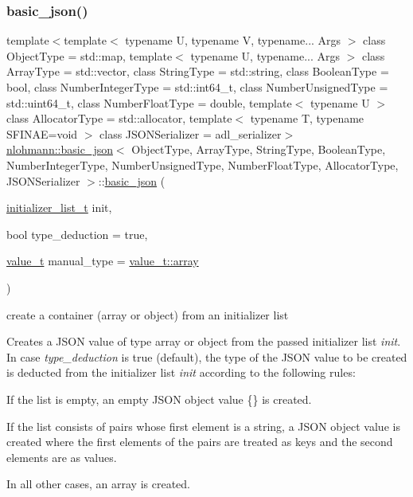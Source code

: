 \subsubsection{\texorpdfstring{basic\+\_\+json()}{basic\_json()}\hspace{0.1cm}{\footnotesize\ttfamily [5/9]}}
{\footnotesize\ttfamily template$<$template$<$ typename U, typename V, typename... Args $>$ class Object\+Type = std\+::map, template$<$ typename U, typename... Args $>$ class Array\+Type = std\+::vector, class String\+Type  = std\+::string, class Boolean\+Type  = bool, class Number\+Integer\+Type  = std\+::int64\+\_\+t, class Number\+Unsigned\+Type  = std\+::uint64\+\_\+t, class Number\+Float\+Type  = double, template$<$ typename U $>$ class Allocator\+Type = std\+::allocator, template$<$ typename T, typename S\+F\+I\+N\+A\+E=void $>$ class J\+S\+O\+N\+Serializer = adl\+\_\+serializer$>$ \\
\mbox{\hyperlink{classnlohmann_1_1basic__json}{nlohmann\+::basic\+\_\+json}}$<$ Object\+Type, Array\+Type, String\+Type, Boolean\+Type, Number\+Integer\+Type, Number\+Unsigned\+Type, Number\+Float\+Type, Allocator\+Type, J\+S\+O\+N\+Serializer $>$\+::\mbox{\hyperlink{classnlohmann_1_1basic__json}{basic\+\_\+json}} (\begin{DoxyParamCaption}\item[{\mbox{\hyperlink{classnlohmann_1_1basic__json_ad70a098fbc01c53497db29d3b5b656a9}{initializer\+\_\+list\+\_\+t}}}]{init,  }\item[{bool}]{type\+\_\+deduction = {\ttfamily true},  }\item[{\mbox{\hyperlink{namespacenlohmann_1_1detail_a1ed8fc6239da25abcaf681d30ace4985}{value\+\_\+t}}}]{manual\+\_\+type = {\ttfamily \mbox{\hyperlink{namespacenlohmann_1_1detail_a1ed8fc6239da25abcaf681d30ace4985af1f713c9e000f5d3f280adbd124df4f5}{value\+\_\+t\+::array}}} }\end{DoxyParamCaption})\hspace{0.3cm}{\ttfamily [inline]}}



create a container (array or object) from an initializer list 

Creates a J\+S\+ON value of type array or object from the passed initializer list {\itshape init}. In case {\itshape type\+\_\+deduction} is {\ttfamily true} (default), the type of the J\+S\+ON value to be created is deducted from the initializer list {\itshape init} according to the following rules\+:


\begin{DoxyEnumerate}
\item If the list is empty, an empty J\+S\+ON object value {\ttfamily \{\}} is created.
\item If the list consists of pairs whose first element is a string, a J\+S\+ON object value is created where the first elements of the pairs are treated as keys and the second elements are as values.
\item In all other cases, an array is created.
\end{DoxyEnumerate}

